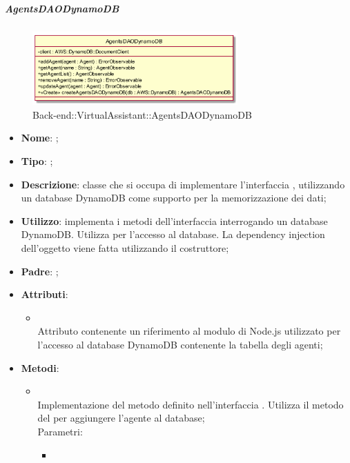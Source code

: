 \hypertarget{AgentsDAODynamoDB_label}{\subparagraph{AgentsDAODynamoDB}}
\begin{figure}[h]
	\centering
	\includegraphics[width=0.70\textwidth,height=\textheight,keepaspectratio]{images/ClassAgentsDAODynamoDB.png}
	\caption{Back-end::VirtualAssistant::AgentsDAODynamoDB}
\end{figure}
\begin{itemize}
	\item \textbf{Nome}: ;
	\item \textbf{Tipo}: ;
	\item \textbf{Descrizione}: classe che si occupa di implementare l'interfaccia , utilizzando un database DynamoDB come supporto per la memorizzazione dei dati;
	\item \textbf{Utilizzo}: implementa i metodi dell'interfaccia  interrogando un database DynamoDB. Utilizza  per l'accesso al database. La dependency injection dell'oggetto  viene fatta utilizzando il costruttore;
	\item \textbf{Padre}: ;
	\item \textbf{Attributi}:
	\begin{itemize}
		\item[]  \\
		Attributo contenente un riferimento al modulo di Node.js utilizzato per l'accesso al database DynamoDB contenente la tabella degli agenti;
	\end{itemize}
	\item \textbf{Metodi}:
	\begin{itemize}
		\item[]  \\		Implementazione del metodo definito nell'interfaccia . Utilizza il metodo  del  per aggiungere l'agente al database;\\
		Parametri:
		\begin{itemize}
			\item {} \\

\end{itemize}
\end{itemize}
\end{itemize}
